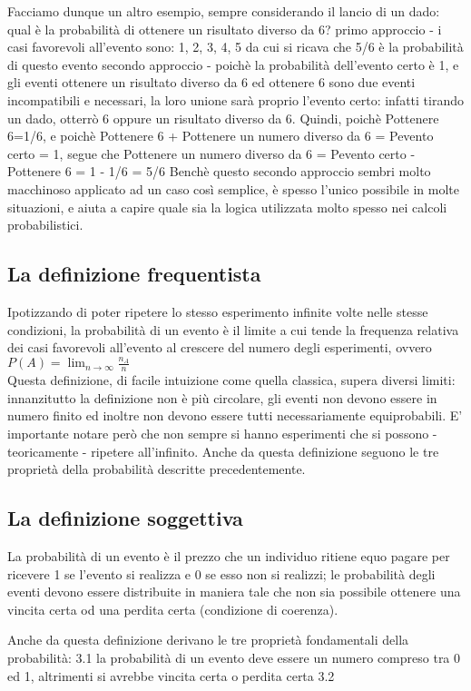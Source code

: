 \documentclass[a4paper]{article}
\begin{document}
Facciamo dunque un altro esempio, sempre considerando il lancio di un dado: qual \`{e} la probabilit\`{a} di ottenere un risultato diverso da 6?
primo approccio - i casi favorevoli all'evento sono: {1, 2, 3, 4, 5} da cui si ricava che 5/6 \`{e} la probabilit\`{a} di questo evento
secondo approccio - poich\`{e} la probabilit\`{a} dell'evento certo \`{e} 1, e gli eventi {ottenere un risultato diverso da 6} ed {ottenere 6} sono due eventi incompatibili e necessari, la loro unione sar\`{a} proprio l'evento certo: infatti tirando un dado, otterrò 6 oppure un risultato diverso da 6. Quindi, poich\`{e} P{ottenere 6}=1/6, e poich\`{e} P{ottenere 6} + P{ottenere un numero diverso da 6} = P{evento certo} = 1, segue che P{ottenere un numero diverso da 6} = P{evento certo} - P{ottenere 6} = 1 - 1/6 = 5/6
Bench\`{e} questo secondo approccio sembri molto macchinoso applicato ad un caso così semplice, \`{e} spesso l'unico possibile in molte situazioni, e aiuta a capire quale sia la logica utilizzata molto spesso nei calcoli probabilistici.

\subsection{La definizione frequentista}
Ipotizzando di poter ripetere lo stesso esperimento infinite volte nelle stesse condizioni, la probabilit\`{a} di un evento \`{e} il limite a cui tende la frequenza relativa dei casi favorevoli all'evento al crescere del numero degli esperimenti, ovvero
\\
\begin{math}
 P(A)= \lim_{n \to \infty} \frac{n_A}{n}
\end{math}
\\
Questa definizione, di facile intuizione come quella classica, supera diversi limiti: innanzitutto la definizione non \`{e} più circolare, gli eventi non devono essere in numero finito ed inoltre non devono essere tutti necessariamente equiprobabili.
E' importante notare però che non sempre si hanno esperimenti che si possono - teoricamente - ripetere all'infinito.
Anche da questa definizione seguono le tre propriet\`{a} della probabilit\`{a} descritte precedentemente.

\subsection{La definizione soggettiva}
La probabilit\`{a} di un evento \`{e} il prezzo che un individuo ritiene equo pagare per ricevere 1 se l'evento si realizza e 0 se esso non si realizzi; le probabilit\`{a} degli eventi devono essere distribuite in maniera tale che non sia possibile ottenere una vincita certa od una perdita certa (condizione di coerenza).

Anche da questa definizione derivano le tre propriet\`{a} fondamentali della probabilit\`{a}:
3.1 la probabilit\`{a} di un evento deve essere un numero compreso tra 0 ed 1, altrimenti si avrebbe vincita certa o perdita certa
3.2 
\end{document}
